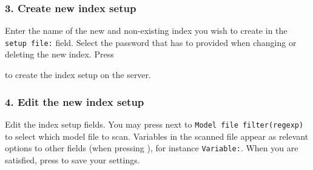 \documentclass[letterpaper,10pt,twoside,twocolumn,openany]{book}
\begin{document}
\subsubsection{3. Create new index setup}
Enter the name of the new and non-existing index you wish to create in the \lstinline!setup file:! field.
Select the password that has to provided when changing or deleting the new index.
Press { to create the index setup on the server.
\subsubsection{4. Edit the new index setup}
Edit the index setup fields.
You may press  next to
\lstinline!Model file filter(regexp)! to select which model file to scan.
Variables in the scanned file appear as
relevant options to other fields (when pressing ),
for instance  \lstinline!Variable:!.
When you are satisfied, press  to save your settings.
}
\end{document}
